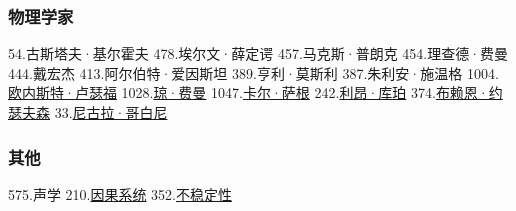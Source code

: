 \subsubsection{物理学家}
54.古斯塔夫·基尔霍夫
478.埃尔文·薛定谔
457.马克斯·普朗克
454.理查德·费曼
444.戴宏杰
413.阿尔伯特·爱因斯坦
389.亨利·莫斯利
387.朱利安·施温格
1004.\href{https://wuli.wiki/assets/sogou/1004.\%E6\%AC\%A7\%E5\%86\%85\%E6\%96\%AF\%E7\%89\%B9\%C2\%B7\%E5\%8D\%A2\%E7\%91\%9F\%E7\%A6\%8F\%20-\%20\%E6\%90\%9C\%E7\%8B\%97\%E7\%A7\%91\%E5\%AD\%A6\%E7\%99\%BE\%E7\%A7\%91.html}{欧内斯特·卢瑟福}
1028.\href{https://wuli.wiki/assets/sogou/1028.\%E7\%90\%BC\%C2\%B7\%E8\%B4\%B9\%E6\%9B\%BC\%20-\%20\%E6\%90\%9C\%E7\%8B\%97\%E7\%A7\%91\%E5\%AD\%A6\%E7\%99\%BE\%E7\%A7\%91.html}{琼·费曼}
1047.\href{https://wuli.wiki/assets/sogou/1047.\%E5\%8D\%A1\%E5\%B0\%94\%C2\%B7\%E8\%90\%A8\%E6\%A0\%B9\%20-\%20\%E6\%90\%9C\%E7\%8B\%97\%E7\%A7\%91\%E5\%AD\%A6\%E7\%99\%BE\%E7\%A7\%91.html}{卡尔·萨根}
242.\href{https://wuli.wiki/assets/sogou/242.\%E5\%88\%A9\%E6\%98\%82\%C2\%B7\%E5\%BA\%93\%E7\%8F\%80\%20-\%20\%E6\%90\%9C\%E7\%8B\%97\%E7\%A7\%91\%E5\%AD\%A6\%E7\%99\%BE\%E7\%A7\%91.html}{利昂·库珀}
374.\href{https://wuli.wiki/assets/sogou/374.\%E5\%B8\%83\%E8\%B5\%96\%E6\%81\%A9\%C2\%B7\%E7\%BA\%A6\%E7\%91\%9F\%E5\%A4\%AB\%E6\%A3\%AE\%20-\%20\%E6\%90\%9C\%E7\%8B\%97\%E7\%A7\%91\%E5\%AD\%A6\%E7\%99\%BE\%E7\%A7\%91.html}{布赖恩·约瑟夫森}
33.\href{https://wuli.wiki/assets/sogou/33.\%E5\%B0\%BC\%E5\%8F\%A4\%E6\%8B\%89\%C2\%B7\%E5\%93\%A5\%E7\%99\%BD\%E5\%B0\%BC\%20-\%20\%E6\%90\%9C\%E7\%8B\%97\%E7\%A7\%91\%E5\%AD\%A6\%E7\%99\%BE\%E7\%A7\%91.html}{尼古拉·哥白尼}

\subsubsection{其他}
575.声学
210.\href{https://wuli.wiki/assets/sogou/210.\%E5\%9B\%A0\%E6\%9E\%9C\%E7\%B3\%BB\%E7\%BB\%9F\%20-\%20\%E6\%90\%9C\%E7\%8B\%97\%E7\%A7\%91\%E5\%AD\%A6\%E7\%99\%BE\%E7\%A7\%91.html}{因果系统}
352.\href{https://wuli.wiki/assets/sogou/352.\%E4\%B8\%8D\%E7\%A8\%B3\%E5\%AE\%9A\%E6\%80\%A7\%20-\%20\%E6\%90\%9C\%E7\%8B\%97\%E7\%A7\%91\%E5\%AD\%A6\%E7\%99\%BE\%E7\%A7\%91.html}{不稳定性}


